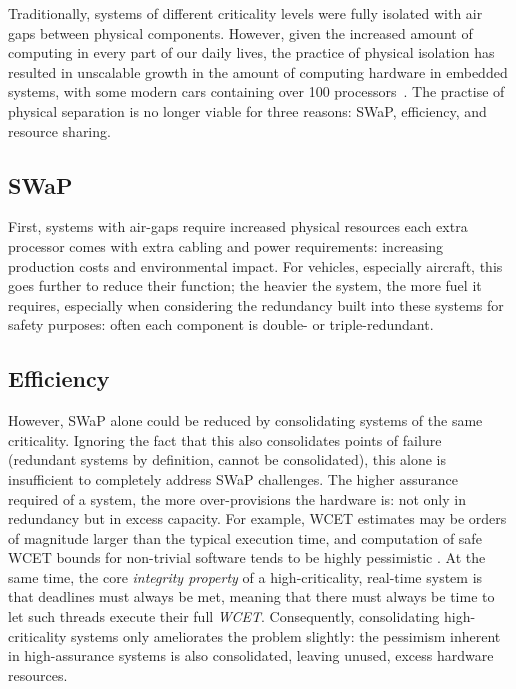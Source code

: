 Traditionally, systems of different criticality levels were fully isolated with
air gaps between physical components. However, given the increased amount of
computing in every part of our daily lives, the practice of physical isolation
has resulted in unscalable growth in the amount of computing hardware in
embedded systems, with some modern cars containing over 100
processors~\citep{Hergenhan_Heiser_08}. The practise of physical separation is no 
longer viable for three reasons: \gls{SWaP}, efficiency, and resource sharing.

\subsection{SWaP}

First, systems with air-gaps require increased physical
resources each extra processor comes with extra cabling and power requirements:
increasing production costs and environmental impact.
For vehicles, especially aircraft, this goes further to reduce their function; the
heavier the system, the more fuel it requires, especially when considering 
the redundancy built into these systems for safety purposes: often each component is double- or
triple-redundant. 

\subsection{Efficiency} 

However, \gls{SWaP} alone could be reduced by consolidating systems of the same
criticality. Ignoring the fact that this also consolidates points of failure (redundant systems by
definition, cannot be consolidated), this alone is insufficient to completely address \gls{SWaP}
challenges. The higher assurance required of a system, the more over-provisions the hardware is: not only in
redundancy but in excess capacity. For example, \gls{WCET}
estimates may be orders of magnitude larger than the typical execution time, and
computation of safe \gls{WCET} bounds for non-trivial software tends to be highly pessimistic
\citep{Wilhelm_EEHTWBFHMMPPSS_08}. At the same time, the core \emph{integrity property} of a
high-criticality, real-time system is that deadlines must always be
met, meaning that there must always be time to let such threads execute their full \emph{\gls{WCET}}.
Consequently, consolidating high-criticality
systems only ameliorates the problem slightly: the pessimism inherent in high-assurance systems is
also consolidated, leaving unused, excess hardware resources.

